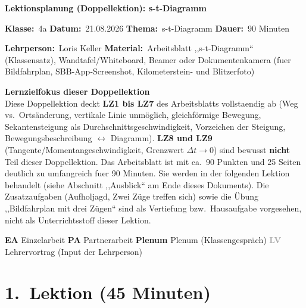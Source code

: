 \documentclass[11pt,a4paper]{article}
\newcommand{\EA}{\textcolor{accentblue}{\textbf{EA}}}
\newcommand{\PA}{\textcolor{groupteal}{\textbf{PA}}}
\newcommand{\PL}{\textcolor{titleblue}{\textbf{Plenum}}}
\newcommand{\LV}{\textcolor{darkgray}{\textbf{LV}}}
\begin{document}
\begin{titlebox}
{\color{white}\sffamily\bfseries\Large Lektionsplanung (Doppellektion): s-t-Diagramm}
\end{titlebox}

\noindent\textbf{Klasse:}~4a \hfill \textbf{Datum:}~21.08.2026 \hfill
\textbf{Thema:}~s-t-Diagramm \hfill \textbf{Dauer:}~90 Minuten
\medskip

\noindent\textbf{Lehrperson:}~Loris Keller \hfill
\textbf{Material:}~Arbeitsblatt ,,s-t-Diagramm`` (Klassensatz), Wandtafel/Whiteboard,
Beamer oder Dokumentenkamera (fuer Bildfahrplan, SBB-App-Screenshot,
Kilometerstein- und Blitzerfoto)

\begin{infobox}
\textbf{Lernzielfokus dieser Doppellektion}\\
Diese Doppellektion deckt \textbf{LZ1 bis LZ7} des Arbeitsblatts vollstaendig
ab (Weg vs.\ Ortsänderung, vertikale Linie unmöglich, gleichförmige
Bewegung, Sekantensteigung als Durchschnittsgeschwindigkeit, Vorzeichen der
Steigung, Bewegungsbeschreibung $\leftrightarrow$ Diagramm). \textbf{LZ8 und
LZ9} (Tangente/Momentangeschwindigkeit, Grenzwert $\Delta t \to 0$) sind
bewusst \textbf{nicht} Teil dieser Doppellektion. Das Arbeitsblatt ist mit
ca.\ 90 Punkten und 25 Seiten deutlich zu umfangreich fuer 90 Minuten. Sie
werden in der folgenden Lektion behandelt (siehe Abschnitt ,,Ausblick`` am
Ende dieses Dokuments). Die Zusatzaufgaben (Aufholjagd, Zwei Züge treffen
sich) sowie die Übung ,,Bildfahrplan mit drei Zügen`` sind als Vertiefung
bzw.\ Hausaufgabe vorgesehen, nicht als Unterrichtsstoff dieser Lektion.
\end{infobox}

\begin{hinweisbox}
\EA{} Einzelarbeit \quad \PA{} Partnerarbeit \quad \PL{} Plenum
(Klassengespräch) \quad \LV{} Lehrervortrag (Input der Lehrperson)
\end{hinweisbox}

\section*{1.\ Lektion (45 Minuten)}
\end{document}
